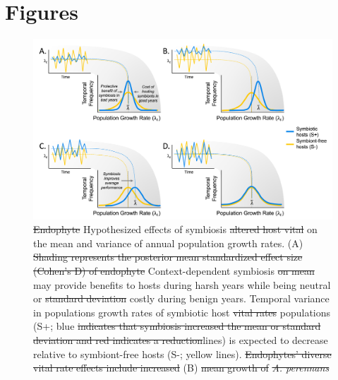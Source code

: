 \documentclass[lineno,sn-nature]{sn-jnl}%
\providecommand{\DIFadd}[1]{{\protect\color{blue}#1}} %
\providecommand{\DIFdel}[1]{{\protect\color{red}\protect\scriptsize\sout{#1}}}
\providecommand{\DIFadd}[1]{{\protect\color{blue}\uwave{#1}}} %
\providecommand{\DIFdel}[1]{{\protect\color{red}\sout{#1}}}                      %
\providecommand{\DIFaddFL}[1]{\DIFadd{#1}} %
\providecommand{\DIFdelFL}[1]{\DIFdel{#1}} %
\providecommand{\DIFaddbeginFL}{} %
\providecommand{\DIFaddendFL}{} %
\providecommand{\DIFdelbeginFL}{} %
\providecommand{\DIFdelendFL}{} %
\newcommand{\DIFscaledelfig}{0.5}
\newlength{\DIFdelgraphicswidth} %
\newlength{\DIFdelgraphicsheight} %
\newcommand{\DIFaddincludegraphics}[2][]{{\color{blue}\fbox{\DIFOincludegraphics[#1]{#2}}}} %
\newcommand{\DIFdelincludegraphics}[2][]{%
\sbox{\DIFdelgraphicsbox}{\DIFOincludegraphics[#1]{#2}}%
\settoboxwidth{\DIFdelgraphicswidth}{\DIFdelgraphicsbox} %
\settoboxtotalheight{\DIFdelgraphicsheight}{\DIFdelgraphicsbox} %
\scalebox{\DIFscaledelfig}{%
\parbox[b]{\DIFdelgraphicswidth}{\usebox{\DIFdelgraphicsbox}\\[-\baselineskip] \rule{\DIFdelgraphicswidth}{0em}}\llap{\resizebox{\DIFdelgraphicswidth}{\DIFdelgraphicsheight}{%
\setlength{\unitlength}{\DIFdelgraphicswidth}%
\begin{picture}(1,1)%
\thicklines\linethickness{2pt} %
{\color[rgb]{1,0,0}\put(0,0){\framebox(1,1){}}}%
{\color[rgb]{1,0,0}\put(0,0){\line( 1,1){1}}}%
{\color[rgb]{1,0,0}\put(0,1){\line(1,-1){1}}}%
\end{picture}%
}\hspace*{3pt}}} %
} %
\DeclareRobustCommand{\DIFaddbeginFL}{\DIFOaddbeginFL \let\includegraphics\DIFaddincludegraphics} %
\DeclareRobustCommand{\DIFaddendFL}{\DIFOaddendFL \let\includegraphics\DIFOincludegraphics} %
\DeclareRobustCommand{\DIFdelbeginFL}{\DIFOdelbeginFL \let\includegraphics\DIFdelincludegraphics} %
\DeclareRobustCommand{\DIFdelendFL}{\DIFOaddendFL \let\includegraphics\DIFOincludegraphics} %
\begin{document}
\section*{Figures}

\begin{figure}[h]
	\centering
	\DIFdelbeginFL %
\DIFdelendFL \DIFaddbeginFL \includegraphics[width=\linewidth]{StochDemo_new_Fig1.png}
	\DIFaddendFL \caption{\DIFdelbeginFL \DIFdelFL{Endophyte }\DIFdelendFL \DIFaddbeginFL \DIFaddFL{Hypothesized effects of }\DIFaddendFL symbiosis \DIFdelbeginFL \DIFdelFL{altered host vital }\DIFdelendFL \DIFaddbeginFL \DIFaddFL{on the mean and variance of annual population growth }\DIFaddendFL rates. (A) \DIFdelbeginFL \DIFdelFL{Shading represents the posterior mean standardized effect size (Cohen's D) of endophyte }\DIFdelendFL \DIFaddbeginFL \DIFaddFL{Context-dependent }\DIFaddendFL symbiosis \DIFdelbeginFL \DIFdelFL{on mean }\DIFdelendFL \DIFaddbeginFL \DIFaddFL{may provide benefits to hosts during harsh years while being neutral }\DIFaddendFL or \DIFdelbeginFL \DIFdelFL{standard deviation }\DIFdelendFL \DIFaddbeginFL \DIFaddFL{costly during benign years.  Temporal variance in populations growth rates }\DIFaddendFL of \DIFaddbeginFL \DIFaddFL{symbiotic }\DIFaddendFL host \DIFdelbeginFL \DIFdelFL{vital rates }\DIFdelendFL \DIFaddbeginFL \DIFaddFL{populations }\DIFaddendFL (\DIFaddbeginFL \DIFaddFL{S+; }\DIFaddendFL blue \DIFdelbeginFL \DIFdelFL{indicates that symbiosis increased the mean or standard deviation and red indicates a reduction}\DIFdelendFL \DIFaddbeginFL \DIFaddFL{lines}\DIFaddendFL ) \DIFaddbeginFL \DIFaddFL{is expected to decrease relative to symbiont-free hosts (S-; yellow lines)}\DIFaddendFL . \DIFdelbeginFL \DIFdelFL{Endophytes' diverse vital rate effects include increased }\DIFdelendFL (B) \DIFdelbeginFL \DIFdelFL{mean growth of }\emph{\DIFdelFL{A. perennans}} %
}
\end{figure}
\end{document}
